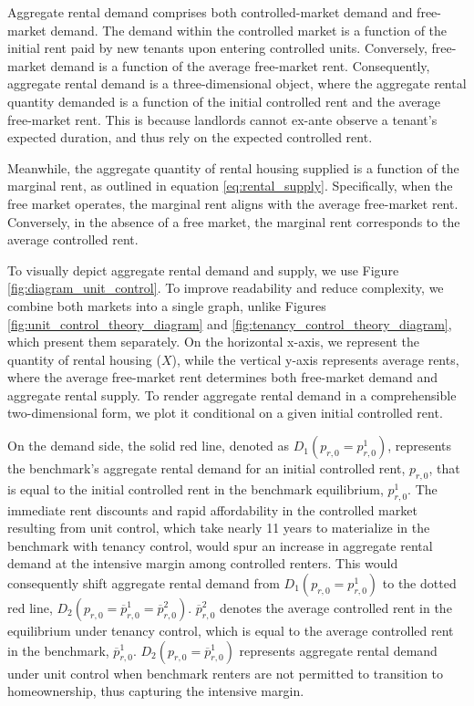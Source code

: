 \documentclass[parskip=full]{article}
\begin{document}
Aggregate rental demand comprises both controlled-market demand and free-market demand. The demand within the controlled market is a function of the initial rent paid by new tenants upon entering controlled units. Conversely, free-market demand is a function of the average free-market rent. Consequently, aggregate rental demand is a three-dimensional object, where the aggregate rental quantity demanded is a function of the initial controlled rent and the average free-market rent. This is because landlords cannot ex-ante observe a tenant's expected duration, and thus rely on the expected controlled rent.

Meanwhile, the aggregate quantity of rental housing supplied is a function of the marginal rent, as outlined in equation \eqref{eq:rental_supply}. Specifically, when the free market operates, the marginal rent aligns with the average free-market rent. Conversely, in the absence of a free market, the marginal rent corresponds to the average controlled rent.

To visually depict aggregate rental demand and supply, we use Figure \ref{fig:diagram_unit_control}. To improve readability and reduce complexity, we combine both markets into a single graph, unlike Figures \ref{fig:unit_control_theory_diagram} and \ref{fig:tenancy_control_theory_diagram}, which present them separately. On the horizontal x-axis, we represent the quantity of rental housing ($X$), while the vertical y-axis represents average rents, where the average free-market rent determines both free-market demand and aggregate rental supply. To render aggregate rental demand in a comprehensible two-dimensional form, we plot it conditional on a given initial controlled rent.

On the demand side, the solid red line, denoted as $D_{1}(p_{r,0}=p^{1}_{r,0})$, represents the benchmark's aggregate rental demand for an initial controlled rent, $p_{r,0}$, that is equal to the initial controlled rent in the benchmark equilibrium, $p^{1}_{r,0}$. The immediate rent discounts and rapid affordability in the controlled market resulting from unit control, which take nearly 11 years to materialize in the benchmark with tenancy control, would spur an increase in aggregate rental demand at the intensive margin among controlled renters. This would consequently shift aggregate rental demand from $D_{1}(p_{r,0}=p^{1}_{r,0})$ to the dotted red line, $D_{2}(p_{r,0}=\overline{p}^{1}_{r,0}=\overline{p}^{2}_{r,0})$. $\overline{p}^{2}_{r,0}$ denotes the average controlled rent in the equilibrium under tenancy control, which is equal to the average controlled rent in the benchmark, $\overline{p}^{1}_{r,0}$. $D_{2}(p_{r,0}=\overline{p}^{1}_{r,0})$ represents aggregate rental demand under unit control when benchmark renters are not permitted to transition to homeownership, thus capturing the intensive margin. 
\end{document}

